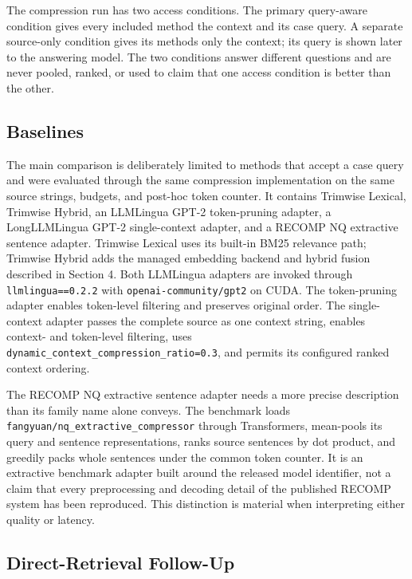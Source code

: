 \documentclass[
]{article}
\begin{document}
The compression run has two access conditions. The primary query-aware
condition gives every included method the context and its case query. A
separate source-only condition gives its methods only the context; its
query is shown later to the answering model. The two conditions answer
different questions and are never pooled, ranked, or used to claim that
one access condition is better than the other.

\subsection{Baselines}\label{baselines}

The main comparison is deliberately limited to methods that accept a
case query and were evaluated through the same compression implementation on the same
source strings, budgets, and post-hoc token counter. It contains
Trimwise Lexical, Trimwise Hybrid, an LLMLingua GPT-2 token-pruning
adapter, a LongLLMLingua GPT-2 single-context adapter, and a RECOMP NQ
extractive sentence adapter. Trimwise Lexical uses its built-in BM25
relevance path; Trimwise Hybrid adds the managed embedding backend and
hybrid fusion described in Section 4. Both LLMLingua adapters are invoked
through \texttt{llmlingua==0.2.2} with \texttt{openai-community/gpt2} on
CUDA. The token-pruning adapter enables token-level filtering and
preserves original order. The single-context adapter passes the complete
source as one context string, enables context- and token-level filtering,
uses \texttt{dynamic\_context\_compression\_ratio=0.3}, and permits its
configured ranked context ordering.

The RECOMP NQ extractive sentence adapter needs a more precise description
than its family name alone conveys. The benchmark loads
\texttt{fangyuan/nq\_extractive\_compressor} through Transformers,
mean-pools its query and sentence representations, ranks source
sentences by dot product, and greedily packs whole sentences under the
common token counter. It is an extractive benchmark adapter built around
the released model identifier, not a claim that every preprocessing and
decoding detail of the published RECOMP system has been reproduced. This
distinction is material when interpreting either quality or latency.

\subsection{Direct-Retrieval Follow-Up}\label{direct-retrieval-follow-up}
\end{document}

